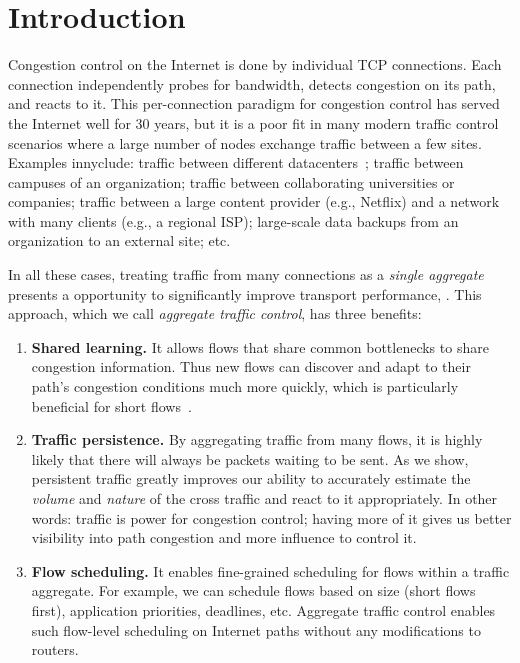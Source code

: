 \section{Introduction}\label{s:intro}

Congestion control on the Internet is done by individual TCP connections. 
Each connection independently probes for bandwidth, detects congestion on its path, and reacts to it. 
This per-connection paradigm for congestion control has served the Internet well for 30 years, but it is a poor fit in many modern traffic control scenarios where a large number of nodes exchange traffic between a few sites. 
Examples innyclude: traffic between different datacenters~\cite{b4, swan}; traffic between campuses of an organization; traffic between collaborating universities or companies; traffic between a large content provider (e.g., Netflix) and a network with many clients (e.g., a regional ISP); large-scale data backups from an organization to an external site; etc. 

In all these cases, treating traffic from many connections as a {\em single aggregate} presents a opportunity to significantly improve transport performance, . This approach, which we call {\em aggregate traffic control}, has three benefits: 
\begin{enumerate}
    \item {\bf Shared learning.} It allows flows that share common bottlenecks to share congestion information. Thus new flows can discover and adapt to their path's congestion conditions much more quickly, which is particularly beneficial for short flows~\cite{CM}. 
    
    \item {\bf Traffic persistence.} By aggregating traffic from many flows, it is highly likely that there will always be packets waiting to be sent. As we show, persistent traffic greatly improves our ability to accurately estimate the {\em volume} and {\em nature} of the cross traffic and react to it appropriately. 
    In other words: traffic is power for congestion control; having more of it gives us better visibility into path congestion and more influence to control it. 
    
    \item {\bf Flow scheduling.} It enables fine-grained scheduling for flows within a traffic aggregate. For example, we can schedule flows based on size (short flows first), application priorities, deadlines, etc. Aggregate traffic control enables such flow-level scheduling on Internet paths without any modifications to routers.
\end{enumerate}

